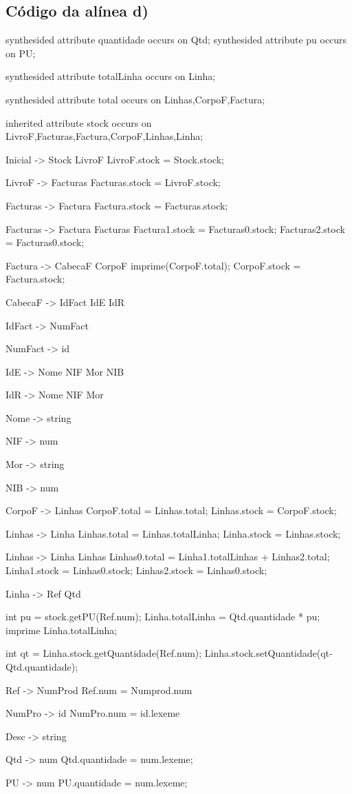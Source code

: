 \documentclass[11pt,a4paper]{article}
\begin{document}
\subsection{Código da alínea d)}
\begin{code_txt} 
synthesided attribute quantidade occurs on Qtd;
synthesided attribute pu occurs on PU;

synthesided attribute totalLinha occurs on Linha;

synthesided attribute total occurs on Linhas,CorpoF,Factura;

inherited attribute stock occurs on LivroF,Facturas,Factura,CorpoF,Linhas,Linha;




Inicial -> Stock LivroF { LivroF.stock = Stock.stock; }

LivroF -> Facturas { Facturas.stock = LivroF.stock;}

Facturas -> Factura {Factura.stock = Facturas.stock;}

Facturas -> Factura Facturas {Factura1.stock = Facturas0.stock; Facturas2.stock = Facturas0.stock;} 

Factura -> CabecaF CorpoF { imprime(CorpoF.total); CorpoF.stock = Factura.stock;}

CabecaF -> IdFact IdE IdR

IdFact -> NumFact

NumFact -> id

IdE -> Nome NIF Mor NIB

IdR -> Nome NIF Mor

Nome -> string

NIF -> num

Mor -> string

NIB -> num

CorpoF -> Linhas {CorpoF.total = Linhas.total; Linhas.stock = CorpoF.stock;} 

Linhas -> Linha {Linhas.total = Linhas.totalLinha; Linha.stock = Linhas.stock;}

Linhas -> Linha Linhas {Linhas0.total = Linha1.totalLinhas + Linhas2.total; Linha1.stock = Linhas0.stock; Linhas2.stock = Linhas0.stock; } 

Linha -> Ref Qtd {  int pu = stock.getPU(Ref.num);
 					Linha.totalLinha = Qtd.quantidade * pu;
					imprime Linha.totalLinha;
					
					int qt = Linha.stock.getQuantidade(Ref.num);
					Linha.stock.setQuantidade(qt-Qtd.quantidade);	
						}

Ref -> NumProd { Ref.num = Numprod.num}

NumPro -> id {NumPro.num = id.lexeme}

Desc -> string

Qtd -> num  { Qtd.quantidade = num.lexeme;}

PU -> num	{ PU.quantidade = num.lexeme;}



\end{code_txt} 
\end{document}
